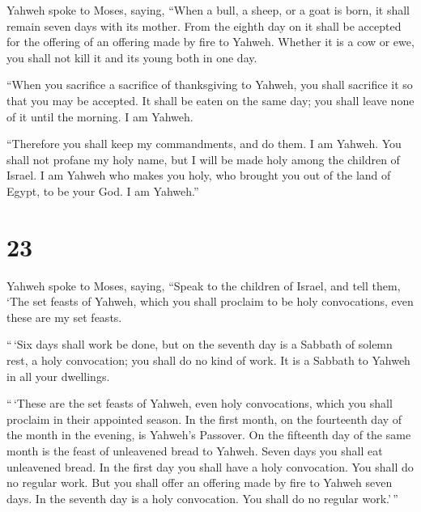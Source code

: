  Yahweh spoke to Moses, saying,  ``When a
bull, a sheep, or a goat is born, it shall remain seven days with its
mother. From the eighth day on it shall be accepted for the offering of
an offering made by fire to Yahweh.  Whether it is a cow or
ewe, you shall not kill it and its young both in one day.

 ``When you sacrifice a sacrifice of thanksgiving to
Yahweh, you shall sacrifice it so that you may be accepted.
 It shall be eaten on the same day; you shall leave none of
it until the morning. I am Yahweh.

 ``Therefore you shall keep my commandments, and do them. I
am Yahweh.  You shall not profane my holy name, but I will
be made holy among the children of Israel. I am Yahweh who makes you
holy,  who brought you out of the land of Egypt, to be your
God. I am Yahweh.''

\hypertarget{section-22}{%
\section{23}\label{section-22}}

 Yahweh spoke to Moses, saying,  ``Speak to the
children of Israel, and tell them, `The set feasts of Yahweh, which you
shall proclaim to be holy convocations, even these are my set feasts.

 ``\,`Six days shall work be done, but on the seventh day is
a Sabbath of solemn rest, a holy convocation; you shall do no kind of
work. It is a Sabbath to Yahweh in all your dwellings.

 ``\,`These are the set feasts of Yahweh, even holy
convocations, which you shall proclaim in their appointed season.
 In the first month, on the fourteenth day of the month in
the evening, is Yahweh's Passover.  On the fifteenth day of
the same month is the feast of unleavened bread to Yahweh. Seven days
you shall eat unleavened bread.  In the first day you shall
have a holy convocation. You shall do no regular work.  But
you shall offer an offering made by fire to Yahweh seven days. In the
seventh day is a holy convocation. You shall do no regular work.'\,''

